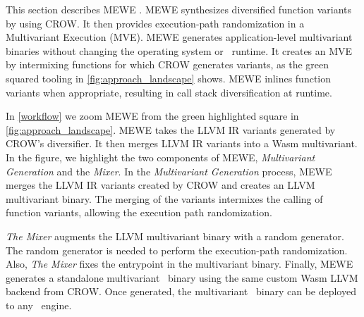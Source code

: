 
\label{section:mewe}

\renewcommand{\tool}{MEWE\xspace}
This section describes MEWE \cite{MEWE}. 
\tool synthesizes diversified function variants by using CROW.
It then provides execution-path randomization in a Multivariant Execution (MVE).
MEWE generates application-level multivariant binaries without changing the operating system or \wasm\ runtime.
It creates an MVE by intermixing functions for which CROW generates variants, as the green squared tooling in \autoref{fig:approach_landscape} shows.
\tool inlines function variants when appropriate, resulting in call stack diversification at runtime.



In \autoref{workflow} we zoom MEWE from the green highlighted square in \autoref{fig:approach_landscape}. 
MEWE takes the LLVM IR variants generated by CROW's diversifier. 
It then merges LLVM IR variants into a Wasm multivariant.
In the figure, we highlight the two components of MEWE, \emph{Multivariant Generation} and the \emph{Mixer}.
In the \emph{Multivariant Generation} process, 
MEWE merges the LLVM IR variants created by CROW and creates an LLVM multivariant binary.
The merging of the variants intermixes the calling of function variants, allowing the execution path randomization.

\emph{The Mixer} augments the LLVM multivariant binary with a random generator. 
The random generator is needed to perform the execution-path randomization.
Also, \emph{The Mixer} fixes the entrypoint in the multivariant binary.
Finally, MEWE generates a standalone multivariant \wasm\ binary using the same custom Wasm LLVM backend from CROW.
Once generated, the multivariant \wasm\ binary can be deployed to any \wasm\ engine. 

